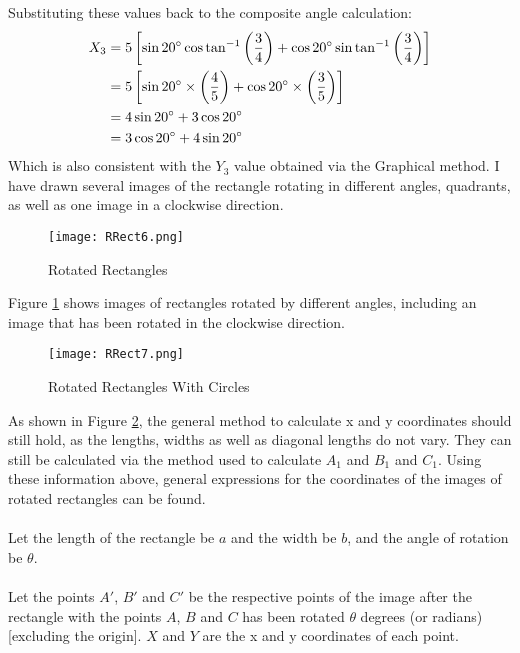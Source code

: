 \documentclass{article}
\begin{document}
            Substituting these values back to the composite angle calculation:
            \begin{align*}
            X_3 &= 5\left[\sin{20\degree}\cos{\tan^{-1}{\left(\frac{3}{4}\right)}} + \cos{20\degree}\sin{\tan^{-1}{\left(\frac{3}{4}\right)}}\right] \\
            &= 5\left[\sin{20\degree}\times \left( \frac{4}{5}\right)  + \cos{20\degree} \times \left( \frac{3}{5}\right)   \right] \\
            &= 4\sin{20\degree} + 3\cos{20\degree} \\
            &= 3\cos{20\degree} + 4\sin{20\degree}
            \end{align*}
            Which is also consistent with the $Y_3$ value obtained via the Graphical method.
        I have drawn several images of the rectangle rotating in different angles, quadrants, as well as one image in a clockwise direction.
        \begin{figure}[h!]
            \texttt{[image: RRect6.png]}
            \caption{Rotated Rectangles}
            \label{fig:rrect6}
        \end{figure} \newpage
        Figure \ref{fig:rrect6} shows images of rectangles rotated by different angles, including an image that has been rotated in the clockwise direction.\newpage
        \begin{figure}[h!]
            \texttt{[image: RRect7.png]}
            \caption{Rotated Rectangles With Circles}
            \label{fig:rrect7}
        \end{figure}
        As shown in Figure \ref{fig:rrect7}, the general method to calculate x and y coordinates should still hold, as the lengths, widths as well as diagonal lengths do not vary. They can still be calculated via the method used to calculate $A_1$ and $B_1$ and $C_1$. \newpage
        Using these information above, general expressions for the coordinates of the images of rotated rectangles can be found. \\\\
        Let the length of the rectangle be $a$ and the width be $b$, and the angle of rotation be $\theta$. \\\\
        Let the points $A'$, $B'$ and $C'$ be the respective points of the image after the rectangle with the points $A$, $B$ and $C$ has been rotated $\theta$ degrees (or radians) [excluding the origin]. $X$ and $Y$ are the x and y coordinates of each point.
\end{document}
